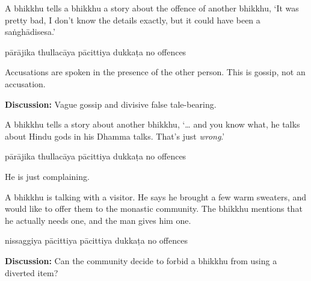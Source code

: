 \begin{exam}{\autoExamName}
\begin{problem*}
\begin{parts}
  \bigskip

\item A bhikkhu tells a bhikkhu a story about the offence of another bhikkhu,
  `It was pretty bad, I don't know the details exactly, but it could have been a
  saṅghādisesa.'

  \bigskip

  \begin{answers}{5}
    \bChoices
     pārājika\eAns
     thullacāya\eAns
     pācittiya\eAns
     dukkaṭa\eAns
     no offences\eAns
    \eChoices
  \end{answers}

  \begin{solution}
    Accusations are spoken in the presence of the other person.
    This is gossip, not an accusation.
  \end{solution}

  \bigskip

  \textbf{Discussion:} Vague gossip and divisive false tale-bearing.

  \bigskip

\item A bhikkhu tells a story about another bhikkhu, `\ldots{} and you know
  what, he talks about Hindu gods in his Dhamma talks. That's just
  \textit{wrong}.'

  \bigskip

  \begin{answers}{5}
    \bChoices
     pārājika\eAns
     thullacāya\eAns
     pācittiya\eAns
     dukkaṭa\eAns
     no offences\eAns
    \eChoices
  \end{answers}

  \begin{solution}
    He is just complaining.
  \end{solution}

  \bigskip

\item A bhikkhu is talking with a visitor. He says he brought a few warm
  sweaters, and would like to offer them to the monastic community. The bhikkhu
  mentions that he actually needs one, and the man gives him one.

  \bigskip

  \begin{answers}{4}
    \bChoices
     nissaggiya pācittiya\eAns
     pācittiya\eAns
     dukkaṭa\eAns
     no offences\eAns
    \eChoices
  \end{answers}

  \bigskip

  \textbf{Discussion:} Can the community decide to forbid a bhikkhu from using a
  diverted item?

\end{parts}

\end{problem*}

\end{exam}
